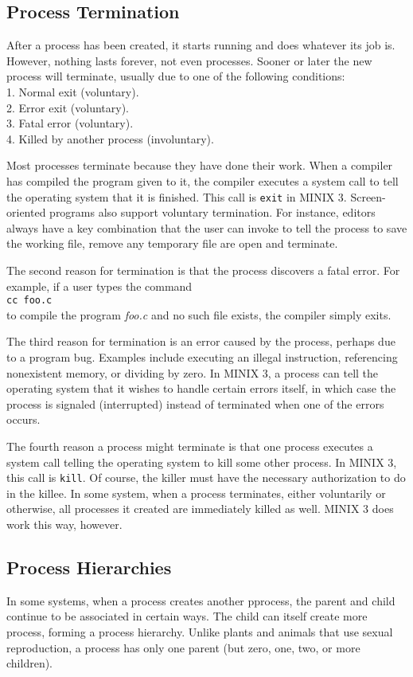 \documentclass{book}
\newcommand {\sys} [1] {\textsl{#1}}
\newcommand {\cmd} [1] {\texttt{#1}}
\begin{document}
\subsection{Process Termination}
After a process has been created, it starts running and does whatever its job is.
However, nothing lasts forever, not even processes.
Sooner or later the new process will terminate, usually due to one of the following conditions:\\
1. Normal exit (voluntary).\\
2. Error exit (voluntary).\\
3. Fatal error (voluntary).\\
4. Killed by another process (involuntary).

Most processes terminate because they have done their work.
When a compiler has compiled the program given to it, 
the compiler executes a system call to tell the operating system that it is finished.
This call is \cmd{exit} in MINIX 3.
Screen-oriented programs also support voluntary termination.
For instance, editors always have a key combination that the user can invoke to tell the process to save the working file, 
remove any temporary file are open and terminate.

The second reason for termination is that the process discovers a fatal error.
For example, if a user types the command\\
\cmd{cc foo.c}\\
to compile the program \sys{foo.c} and no such file exists, the compiler simply exits.

The third reason for termination is an error caused by the process, perhaps due to a program bug.
Examples include executing an illegal instruction, referencing nonexistent memory, or dividing by zero.
In MINIX 3, a process can tell the operating system that it wishes to handle certain errors itself,
in which case the process is signaled (interrupted) instead of terminated when one of the errors occurs.

The fourth reason a process might terminate is that one process executes a system call telling the operating system to kill some other process.
In MINIX 3, this call is \cmd{kill}.
Of course, the killer must have the necessary authorization to do in the killee.
In some system, when a process terminates, either voluntarily or otherwise,
all processes it created are immediately killed as well.
MINIX 3 does work this way, however.

\subsection{Process Hierarchies}
In some systems, when a process creates another pprocess,
the parent and child continue to be associated in certain ways.
The child can itself create more process, forming a process hierarchy.
Unlike plants and animals that use sexual reproduction,
a process has only one parent (but zero, one, two, or more children).
\end{document}
